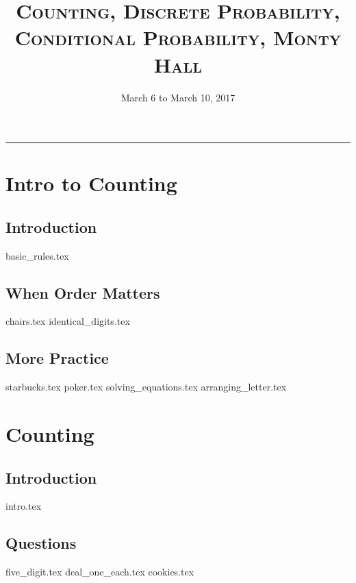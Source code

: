 \documentclass{exam}
\title{\textsc{Counting, Discrete Probability, Conditional Probability, Monty Hall}}
\date{March 6 to March 10, 2017}
\begin{document}
\maketitle
\rule{\textwidth}{0.15em}
\fontsize{12}{15}\selectfont
\thispagestyle{empty}


\section{Intro to Counting}
\subsection{Introduction}
{basic_rules.tex}
\subsection{When Order Matters}
\begin{questions}
{chairs.tex}
{identical_digits.tex}
\end{questions}
\subsection{More Practice}
\begin{questions}
{starbucks.tex}
{poker.tex}
{solving_equations.tex}
{arranging_letter.tex}
\end{questions}

\section{Counting}
\subsection{Introduction}
{intro.tex}
\subsection{Questions}
\begin{questions}
{five_digit.tex}
{deal_one_each.tex}
{cookies.tex}
\end{questions}
\end{document}
